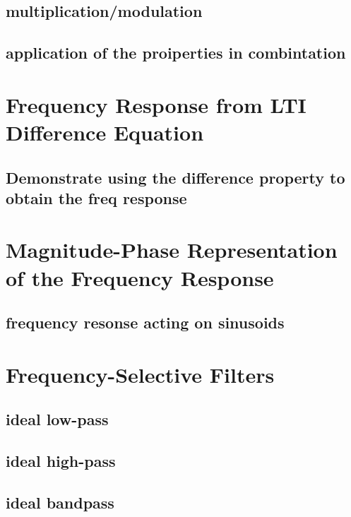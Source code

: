 \documentclass{article}
\begin{document}
\subsection{multiplication/modulation}
\label{sec:org290cfde}

\subsection{application of the proiperties in combintation}
\label{sec:orgb8ac360}

\section{Frequency Response from LTI Difference Equation}
\label{sec:org9ac773f}

\subsection{Demonstrate using the difference property to obtain the freq response}
\label{sec:org806c699}

\section{Magnitude-Phase Representation of the Frequency Response}
\label{sec:org24cb5f9}

\subsection{frequency resonse acting on sinusoids}
\label{sec:org1c9e86b}

\section{Frequency-Selective Filters}
\label{sec:org81f7538}

\subsection{ideal low-pass}
\label{sec:orgcbfe22d}

\subsection{ideal high-pass}
\label{sec:org6e357c1}

\subsection{ideal bandpass}
\label{sec:orgc658523}
\end{document}
